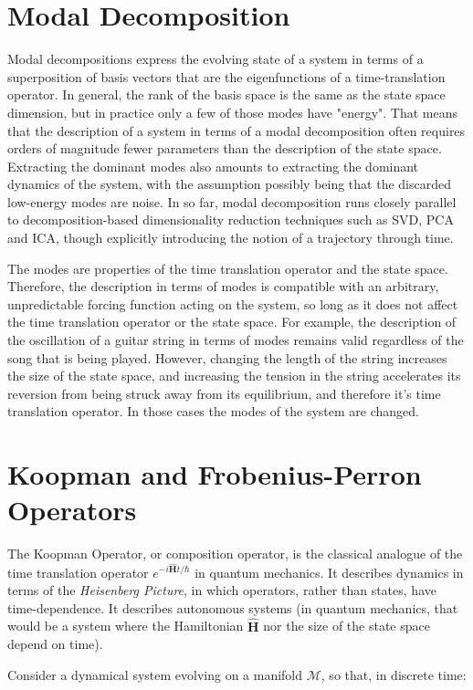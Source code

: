 \section{Modal Decomposition}
Modal decompositions express the evolving state of a system in terms of a superposition of basis vectors that are the eigenfunctions of a time-translation operator. In general, the rank of the basis space is the same as the state space dimension, but in practice only a few of those modes have "energy". That means that the description of a system in terms of a modal decomposition often requires orders of magnitude fewer parameters than the description of the state space. Extracting the dominant modes also amounts to extracting the dominant dynamics of the system, with the assumption possibly being that the discarded low-energy modes are noise. In so far, modal decomposition runs closely parallel to decomposition-based dimensionality reduction techniques such as SVD, PCA and ICA, though explicitly introducing the notion of a trajectory through time.

The modes are properties of the time translation operator and the state space. Therefore, the description in terms of modes is compatible with an arbitrary, unpredictable forcing function acting on the system, so long as it does not affect the time translation operator or the state space. For example, the description of the oscillation of a guitar string in terms of modes remains valid regardless of the song that is being played. However, changing the length of the string increases the size of the state space, and increasing the tension in the string accelerates its reversion from being struck away from its equilibrium, and therefore it's time translation operator. In those cases the modes of the system are changed.   


\section{Koopman and Frobenius-Perron Operators}
The Koopman Operator, or composition operator, is the classical analogue of the time translation operator $e^{-i\mathbf{\hat{H}}t/\hbar}$ in quantum mechanics. It describes dynamics in terms of the \textit{Heisenberg Picture}, in which operators, rather than states, have time-dependence. It describes autonomous systems (in quantum mechanics, that would be a system where the Hamiltonian $\mathbf{\hat{H}}$ nor the size of the state space depend on time).

Consider a dynamical system evolving on a manifold $\mathscr{M}$, so that, in discrete time:

